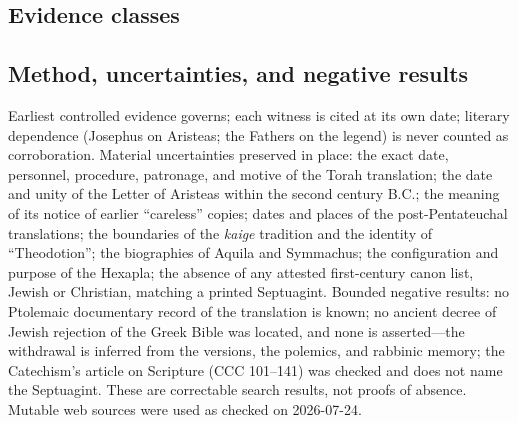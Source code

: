 \subsection{Evidence classes}

\begin{evidencekey}
\end{evidencekey}

\subsection{Method, uncertainties, and negative results}

Earliest controlled evidence governs; each witness is cited at its own
date; literary dependence (Josephus on Aristeas; the Fathers on the
legend) is never counted as corroboration. Material uncertainties
preserved in place: the exact date, personnel, procedure, patronage, and
motive of the Torah translation; the date and unity of the Letter of
Aristeas within the second century B.C.; the meaning of its notice of
earlier ``careless'' copies; dates and places of the post-Pentateuchal
translations; the boundaries of the \textit{kaige} tradition and the
identity of ``Theodotion''; the biographies of Aquila and Symmachus; the
configuration and purpose of the Hexapla; the absence of any attested
first-century canon list, Jewish or Christian, matching a printed
Septuagint. Bounded negative results: no Ptolemaic documentary record of
the translation is known; no ancient decree of Jewish rejection of the
Greek Bible was located, and none is asserted---the withdrawal is
inferred from the versions, the polemics, and rabbinic memory; the
Catechism's article on Scripture (CCC 101--141) was checked and does not
name the Septuagint. These are correctable search results, not proofs of
absence. Mutable web sources were used as checked on 2026-07-24.

